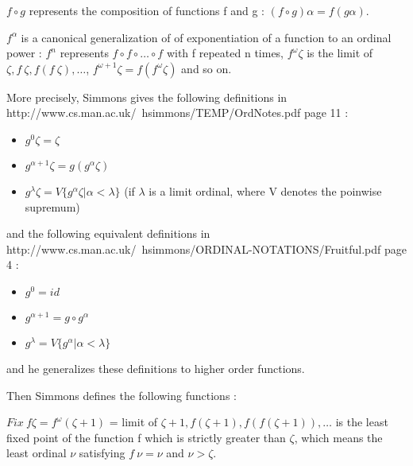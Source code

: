 \documentclass[10pt]{article}
\begin{document}
\( f \circ g \) represents the composition of functions f and g : \( (f \circ g) \alpha = f(g \alpha) \).

\( f^\alpha \) is a canonical generalization of of exponentiation of a function to an ordinal power : \( f^n \) represents \( f \circ f \circ \ldots \circ f \) with f repeated n times, \( f^\omega \zeta \) is the limit of \( \zeta, f\ \zeta, f(f\ \zeta), \ldots \), \( f^{\omega+1} \zeta = f(f^\omega \zeta) \) and so on.

\bigskip

More precisely, Simmons gives the following definitions in http://www.cs.man.ac.uk/~hsimmons/TEMP/OrdNotes.pdf page 11 : 

\begin{itemize}
     \setlength{\itemsep}{1pt}
     \setlength{\parskip}{0pt}
     \setlength{\parsep}{0pt}
\item \( g^0 \zeta = \zeta \)
\item \( g^{\alpha+1} \zeta = g (g^\alpha \zeta) \)
\item \( g^\lambda \zeta = V \lbrace g^\alpha \zeta | \alpha < \lambda \rbrace \) (if \( \lambda \) is a limit ordinal, where V denotes the poinwise supremum)
\end{itemize}

and the following equivalent definitions in http://www.cs.man.ac.uk/~hsimmons/ORDINAL-NOTATIONS/Fruitful.pdf page 4 :

\begin{itemize}
     \setlength{\itemsep}{1pt}
     \setlength{\parskip}{0pt}
     \setlength{\parsep}{0pt}
\item \( g^0 = id \)
\item \( g^{\alpha+1} = g \circ g^\alpha \)
\item \( g^\lambda = V \lbrace g^\alpha | \alpha < \lambda \rbrace \)
\end{itemize}

\bigskip

and he generalizes these definitions to higher order functions.

\bigskip

Then Simmons defines the following functions :


\( Fix\ f \zeta = f^\omega (\zeta+1) \) = limit of \( \zeta+1, f (\zeta+1), f (f (\zeta+1)), \ldots \) is the least fixed point of the function f which is strictly greater than \( \zeta \), which means the least ordinal \( \nu \) satisfying \( f\ \nu = \nu \) and \( \nu > \zeta \).
\end{document}

